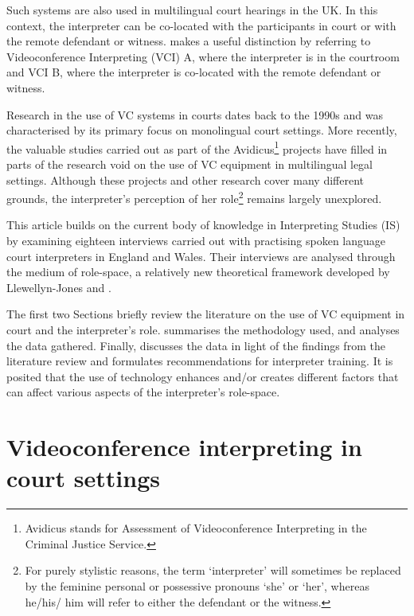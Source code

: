 \documentclass[output=paper]{langsci/langscibook}
\begin{document}
Such systems are also used in multilingual court hearings in the UK. In this context, the interpreter can be co-located with the participants in court or with the remote defendant or witness. \citet{Braun2011} makes a useful distinction by referring to Videoconference Interpreting (VCI) A, where the interpreter is in the courtroom and VCI B, where the interpreter is co-located with the remote defendant or witness. 

Research in the use of VC systems in courts dates back to the 1990s and was characterised by its primary focus on monolingual court settings. More recently, the valuable studies carried out as part of the Avidicus\footnote{Avidicus stands for Assessment of Videoconference Interpreting in the Criminal Justice Service.}  projects have filled in parts of the research void on the use of VC equipment in multilingual legal settings. Although these projects and other research cover many different grounds, the interpreter’s perception of her role\footnote{For purely stylistic reasons, the term ‘interpreter’ will sometimes be replaced by the feminine personal or possessive pronouns ‘she’ or ‘her’, whereas he/his/ him will refer to either the defendant or the witness.} remains largely unexplored. 

This article builds on the current body of knowledge in Interpreting Studies (IS) by examining eighteen interviews carried out with practising spoken language court interpreters in England and Wales. Their interviews are analysed through the medium of role-space, a relatively new theoretical framework developed by Llewellyn-Jones and \citet{Lee2014}.

The first two Sections briefly review the literature on the use of VC equipment in court and the interpreter’s role.  summarises the methodology used, and  analyses the data gathered. Finally,  discusses the data in light of the findings from the literature review and formulates recommendations for interpreter training. It is posited that the use of technology enhances and/or creates different factors that can affect various aspects of the interpreter’s role-space.  

\section{Videoconference interpreting in court settings}
\end{document}

